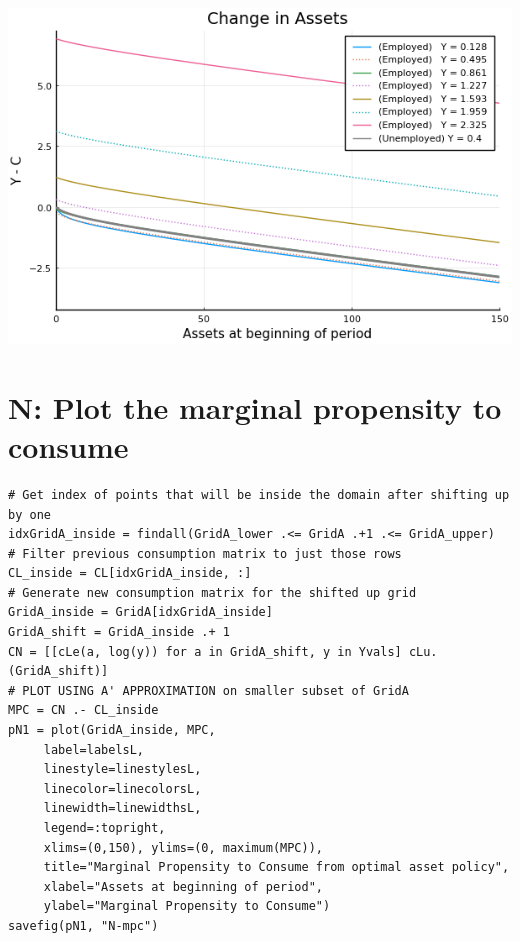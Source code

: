 \documentclass[12pt]{article}
\begin{document}
\includegraphics[]{problem sets/ps9/M-changeinassets.png}








\newpage
\section*{N: Plot the marginal propensity to consume}





\begin{lstlisting}[language=JuliaLocal, style=julia]
# Get index of points that will be inside the domain after shifting up by one
idxGridA_inside = findall(GridA_lower .<= GridA .+1 .<= GridA_upper)
# Filter previous consumption matrix to just those rows
CL_inside = CL[idxGridA_inside, :]
# Generate new consumption matrix for the shifted up grid
GridA_inside = GridA[idxGridA_inside]
GridA_shift = GridA_inside .+ 1
CN = [[cLe(a, log(y)) for a in GridA_shift, y in Yvals] cLu.(GridA_shift)]
# PLOT USING A' APPROXIMATION on smaller subset of GridA
MPC = CN .- CL_inside
pN1 = plot(GridA_inside, MPC,
     label=labelsL,
     linestyle=linestylesL,
     linecolor=linecolorsL,
     linewidth=linewidthsL,
     legend=:topright,
     xlims=(0,150), ylims=(0, maximum(MPC)),
     title="Marginal Propensity to Consume from optimal asset policy",
     xlabel="Assets at beginning of period",
     ylabel="Marginal Propensity to Consume")
savefig(pN1, "N-mpc")
\end{lstlisting}
\end{document}
